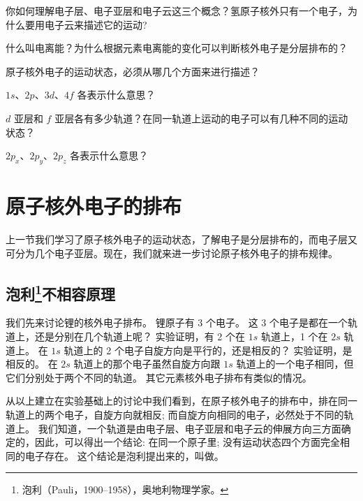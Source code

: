 \begin{Practice}[习题]
  \begin{question}
    \item 你如何理解电子层、电子亚层和电子云这三个概念？氢原子核外只有一个电子，为什么要用电子云来描述它的运动?
    \item 什么叫电离能？为什么根据元素电离能的变化可以判断核外电子是分层排布的？
    \item 原子核外电子的运动状态，必须从哪几个方面来进行描述？
    \item $1s$、$2p$、$3d$、$4f$ 各表示什么意思？
    \item $d$ 亚层和 $f$ 亚层各有多少轨道？在同一轨道上运动的电子可以有几种不同的运动状态？
    \item $2p_x$、$2p_y$、$2p_z$ 各表示什么意思？
  \end{question}
\end{Practice}

\section{原子核外电子的排布}
上一节我们学习了原子核外电子的运动状态，了解电子是分层排布的，而电子层又可分为几个电子亚层。现在，我们就来进一步讨论原子核外电子的排布规律。

\subsection[泡利不相容原理]{泡利\protect\footnote{泡利（Pauli，1900--1958），奥地利物理学家。}不相容原理}
我们先来讨论锂的核外电子排布。
锂原子有 3 个电子。 这 3 个电子是都在一个轨道上，还是分别在几个轨道上呢？
实验证明，有 2 个在 $1s$ 轨道上，1 个在 $2s$ 轨道上。
在 $1s$ 轨道上的 2 个电子自旋方向是平行的，还是相反的？
实验证明，是相反的。
在 $2s$ 轨道上的那个电子虽然自旋方向跟 $1s$ 轨道上的一个电子相同，但它们分别处于两个不同的轨道。
其它元素核外电子排布有类似的情况。

从以上建立在实验基础上的讨论中我们看到，在原子核外电子的排布中，排在同一轨道上的两个电子，自旋方向就相反; 而自旋方向相同的电子，必然处于不同的轨道上。
我们知道，一个轨道是由电子层、电子亚层和电子云的伸展方向三方面确定的，因此，可以得出一个结论: 在同一个原子里; 没有运动状态四个方面完全相同的电子存在。
这个结论是泡利提出来的，叫做。

